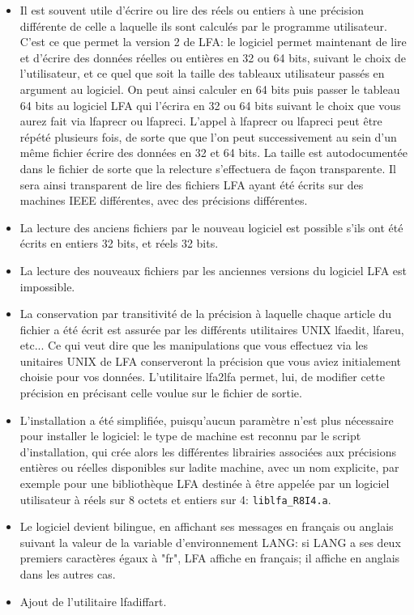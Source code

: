 \documentclass[10pt,french]{book}
\begin{document}
\begin{itemize}
	\item Il est souvent utile d'écrire ou lire
		des réels ou entiers à une précision
		différente de celle a laquelle
		ils sont calculés par le programme utilisateur.
		C'est ce que permet la version 2 de LFA:
		le logiciel permet maintenant de lire
		et d'écrire des données réelles ou entières en
		32 ou 64 bits, suivant le choix
		de l'utilisateur, et ce quel que soit la taille
		des tableaux utilisateur passés en argument au logiciel.
		On peut ainsi calculer en 64 bits puis
		passer le tableau 64 bits au logiciel
		LFA qui l'écrira en 32 ou 64 bits suivant
		le choix que vous aurez fait via lfaprecr ou lfapreci.
		L'appel à lfaprecr ou lfapreci peut être répété
		plusieurs fois, de sorte que que l'on peut successivement au sein 
		d'un même fichier écrire des données en 32 et 64 bits.
		La taille est autodocumentée dans le fichier
		de sorte que la relecture s'effectuera de façon transparente.
		Il sera ainsi transparent de lire des fichiers LFA
		ayant été écrits sur des machines IEEE différentes,
		avec des précisions différentes.
	\item La lecture des anciens fichiers
		par le nouveau logiciel est possible s'ils ont
		été écrits en entiers 32 bits, et réels 32 bits.
	\item La lecture des nouveaux fichiers par les anciennes
		versions du logiciel LFA est impossible.
	\item La conservation par transitivité de la précision
		à laquelle chaque article du fichier a été écrit
		est assurée par les différents utilitaires UNIX lfaedit,
		lfareu, etc... Ce qui veut dire que les manipulations
		que vous effectuez via les unitaires UNIX de LFA 
		conserveront la précision que vous aviez initialement
		choisie pour vos données. L'utilitaire lfa2lfa
		permet, lui, de modifier cette précision en précisant
		celle voulue sur le fichier de sortie.
	\item L'installation  a  été simplifiée, puisqu'aucun paramètre n'est
		plus  nécessaire  pour  installer  le  logiciel:  le type de machine est
		reconnu  par  le  script  d'installation, qui crée alors les différentes
		librairies  associées aux précisions entières ou réelles disponibles sur
		ladite machine,     
		avec un nom explicite, par exemple pour une bibliothèque
		LFA destinée à être appelée par un logiciel utilisateur
		à réels sur 8 octets et entiers sur 4: {\tt liblfa\_R8I4.a}.
	\item Le logiciel devient bilingue, en affichant ses messages
		en français ou anglais suivant la valeur de la variable d'environnement 
		LANG: si LANG a ses deux premiers caractères égaux à "fr",
		LFA affiche en français; il affiche en anglais dans les autres
		cas.
	\item Ajout de l'utilitaire lfadiffart.
\end{itemize}
\end{document}

